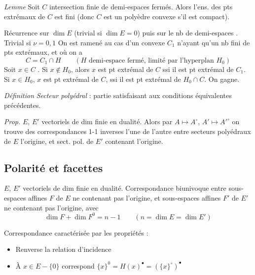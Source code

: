 \documentclass[11pt,a4paper]{article}
\begin{document}
\emph{Lemme} Soit $C$  intersection finie de
demi-espaces fermés. Alors 
l'ens. des pts extrémaux de $C$ est fini (donc $C$ est un polyèdre convexe
s'il est compact). 

Récurrence sur $\dim E$ (trivial si $\dim E = 0$) puis sur le
\struck{\ill{}} nb de demi-espaces . Trivial si
$\nu = 0, 1$  On est ramené au cas d'un convexe
$C_1$ n'ayant qu'un nb fini de pts extrémaux, et où on a
\[
  C = C_1 \cap H
  \qquad (H \text{ demi-espace fermé, limité par l'hyperplan } H_0)
\]
Soit $x \in C$ . Si $x \notin H_0$, alors $x$ est pt
extrémal de $C$ ssi il est pt extrémal de $C_1$. Si $x \in H_0$,
 $x$ est pt extrémal de $C$, ssi il est pt extrémal de
 $H_0 \cap C$. On gagne.


\emph{Définition} \emph{Secteur polyédral} : partie satisfaisant aux
conditions équivalentes précédentes.

\emph{Prop.} $E$, $E'$ vectoriels de dim finie en dualité. Alors par
$A \mapsto A^\circ$, $A' \mapsto A'^\circ$ on trouve des correspondances 1-1
inverses l'une de l'autre entre secteurs polyédraux de $E$
 l'origine, et sect. pol. de $E'$ contenant l'origine.

\subsection{Polarité et facettes}

$E$, $E'$ vectoriels de dim finie en dualité. Correspondance biunivoque
entre sous-espaces affines $F$ de $E$ ne contenant pas l'origine, et
sous-espaces affines $F'$ de $E'$ ne contenant pas l'origine, avec
\[
  \dim F + \dim F^{0} = n - 1 \qquad (n = \dim E = \dim E')
\]

Correspondance caractérisée par les propriétés :
\begin{itemize}
  \item[a)] Renverse la relation d'incidence
  \item[b)] À $x \in E - \{0\}$ correspond
    $\{x\}^{0} = H(x)^{\bullet} = (\{x\}^\circ)^{\bullet}$
\end{itemize}
\end{document}
